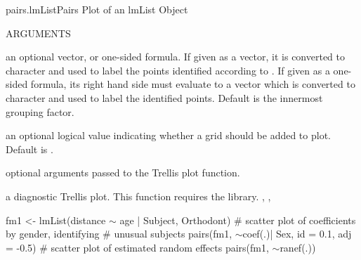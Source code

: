 \documentclass[pdftex]{article} \usepackage{url,graphicx}
\renewcommand{\Twiddle}{\mbox{\(\sim\)}}
\begin{document}
\begin{Helpfile}{pairs.lmList}{Pairs Plot of an lmList Object}
\begin{Argument}{ARGUMENTS}
\item[\Co{idLabels:}]
an optional vector, or one-sided formula. If given as a
vector, it is converted to character and used to label the
points identified according to . If given as a
one-sided formula, its right hand side must evaluate to a vector
which is converted to character and used to label the identified
points. Default is the innermost grouping factor. 
\item[\Co{grid:}]
an optional logical value indicating whether a grid should
be added to plot. Default is .
\item[\Co{...:}]
optional arguments passed to the Trellis plot function.
\end{Argument}
a diagnostic Trellis plot.
 This function requires the  library.
, , 
\need 15pt
\vspace{-16pt}
\begin{Example}
fm1 <- lmList(distance {\Twiddle} age | Subject, Orthodont)
# scatter plot of coefficients by gender, identifying 
# unusual subjects
pairs(fm1, {\Twiddle}coef(.)| Sex, id = 0.1, adj = -0.5)    
# scatter plot of estimated random effects
pairs(fm1, {\Twiddle}ranef(.))
\end{Example}
\end{Helpfile}
\end{document}
